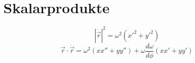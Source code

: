 \section{Skalarprodukte}
\[ |\dot{\vec{r}}|^2 = \omega^2(x'^2 + y'^2) \]
\[ \vec{r}\cdot\ddot{\vec{r}} = \omega^2(xx'' + yy'') + \omega\frac{d\omega}{d\phi}(xx' + yy') \]